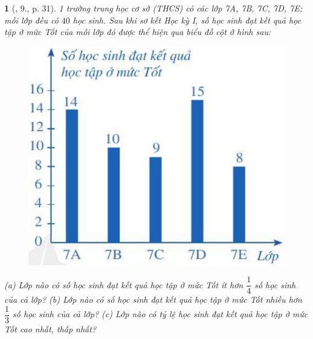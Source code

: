 \documentclass{article}
\newtheorem{baitoan}{}
\begin{document}
\begin{baitoan}[\cite{SGK_Toan_7_Canh_Dieu_tap_1}, 9., p. 31]
	1 trường trung học cơ sở (THCS) có các lớp 7A, 7B, 7C, 7D, 7E; mỗi lớp đều có $40$ học sinh. Sau khi sơ kết Học kỳ I, số học sinh đạt kết quả học tập ở mức Tốt của mỗi lớp đó được thể hiện qua biểu đồ cột ở hình sau:
	\begin{figure}[H]
		\centering
		\includegraphics[scale=.25]{SGK_Toan_7_CD_tap_1_hinh_9_p31}
	\end{figure}
	\noindent(a) Lớp nào có số học sinh đạt kết quả học tập ở mức Tốt ít hơn $\dfrac{1}{4}$ số học sinh của cả lớp? (b) Lớp nào có số học sinh đạt kết quả học tập ở mức Tốt nhiều hơn $\dfrac{1}{3}$ số học sinh của cả lớp? (c) Lớp nào có tỷ lệ học sinh đạt kết quả học tập ở mức Tốt cao nhất, thấp nhất?
\end{baitoan}
\end{document}
